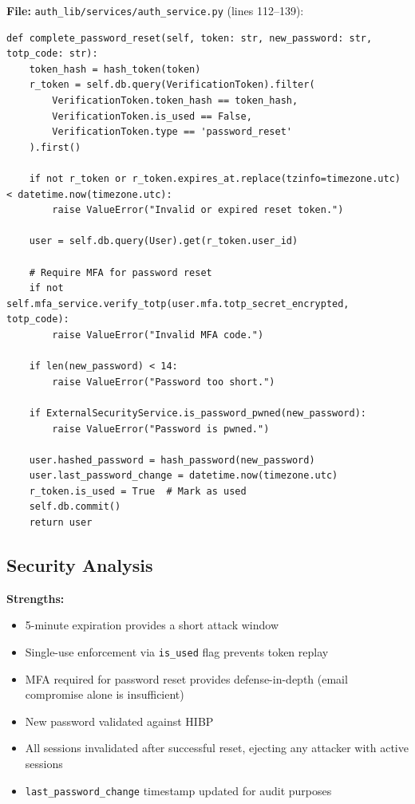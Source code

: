 \documentclass[11pt,a4paper]{article}
\begin{document}
\textbf{File:} \texttt{auth\_lib/services/auth\_service.py} (lines 112--139):
\begin{lstlisting}
def complete_password_reset(self, token: str, new_password: str, totp_code: str):
    token_hash = hash_token(token)
    r_token = self.db.query(VerificationToken).filter(
        VerificationToken.token_hash == token_hash,
        VerificationToken.is_used == False,
        VerificationToken.type == 'password_reset'
    ).first()
    
    if not r_token or r_token.expires_at.replace(tzinfo=timezone.utc) < datetime.now(timezone.utc):
        raise ValueError("Invalid or expired reset token.")
        
    user = self.db.query(User).get(r_token.user_id)
    
    # Require MFA for password reset
    if not self.mfa_service.verify_totp(user.mfa.totp_secret_encrypted, totp_code):
        raise ValueError("Invalid MFA code.")

    if len(new_password) < 14:
        raise ValueError("Password too short.")
        
    if ExternalSecurityService.is_password_pwned(new_password):
        raise ValueError("Password is pwned.")
        
    user.hashed_password = hash_password(new_password)
    user.last_password_change = datetime.now(timezone.utc)
    r_token.is_used = True  # Mark as used
    self.db.commit()
    return user
\end{lstlisting}

\subsection{Security Analysis}

\textbf{Strengths:}
\begin{itemize}[noitemsep]
    \item 5-minute expiration provides a short attack window
    \item Single-use enforcement via \texttt{is\_used} flag prevents token replay
    \item MFA required for password reset provides defense-in-depth (email compromise alone is insufficient)
    \item New password validated against HIBP
    \item All sessions invalidated after successful reset, ejecting any attacker with active sessions
    \item \texttt{last\_password\_change} timestamp updated for audit purposes
\end{itemize}
\end{document}
